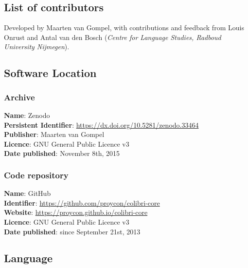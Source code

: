 \documentclass[a4paper,12pt]{article}
\begin{document}
\subsection{List of contributors}

Developed by Maarten van Gompel, with contributions and feedback from Louis
Onrust and Antal van den Bosch (\emph{Centre for Language Studies, Radboud
University Nijmegen}).

\subsection{Software Location}

\subsubsection{Archive}

\begin{addmargin}[2em]{2em}
\textbf{Name}: Zenodo \\
\textbf{Persistent Identifier}: \url{https://dx.doi.org/10.5281/zenodo.33464} \\
\textbf{Publisher}: Maarten van Gompel \\
\textbf{Licence}: GNU General Public Licence v3 \\
\textbf{Date published}: November 8th, 2015 \\
\end{addmargin}

\subsubsection{Code repository}

\begin{addmargin}[2em]{2em}
\textbf{Name}: GitHub \\
\textbf{Identifier}: \url{https://github.com/proycon/colibri-core} \\
\textbf{Website}: \url{https://proycon.github.io/colibri-core} \\
\textbf{Licence}: GNU General Public Licence v3 \\
\textbf{Date published}: since September 21st, 2013 \\
\end{addmargin}

\subsection{Language}
\end{document}
